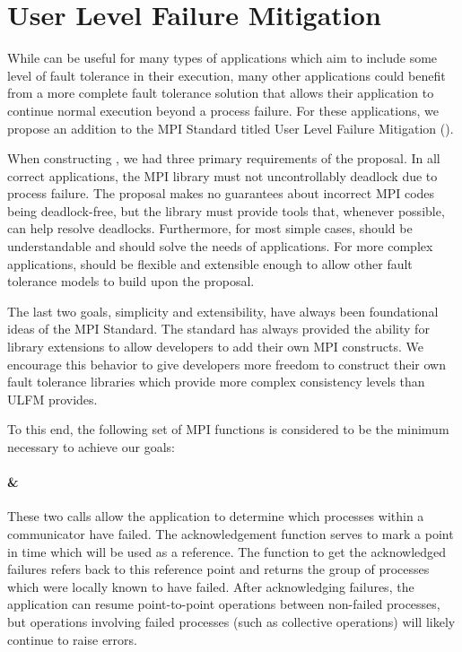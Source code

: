 \section{User Level Failure Mitigation}\label{sect:ulfm}

While \cof can be useful for many types of applications which aim to include
some level of fault tolerance in their execution, many other applications could
benefit from a more complete fault tolerance solution that allows their
application to continue normal execution beyond a process failure. For these
applications, we propose an addition to the MPI Standard titled User Level
Failure Mitigation (\ulfm). 

When constructing \ulfm, we had three primary requirements of the proposal. In
all correct applications, the MPI library must not uncontrollably deadlock due
to process failure. The proposal makes no guarantees about incorrect MPI codes
being deadlock-free, but the library must provide tools that, whenever
possible, can help resolve deadlocks. Furthermore, for most simple cases, \ulfm
should be understandable and should solve the needs of applications. For more
complex applications, \ulfm should be flexible and extensible enough to allow
other fault tolerance models to build upon the proposal. 

The last two goals, simplicity and extensibility, have always been foundational
ideas of the MPI Standard. The standard has always provided the ability for
library extensions to allow developers to add their own MPI constructs. We
encourage this behavior to give developers more freedom to construct their own
fault tolerance libraries which provide more complex consistency levels than
ULFM provides.

To this end, the following set of MPI functions is considered to be the minimum
necessary to achieve our goals:

\paragraph{ \&
}

These two calls allow the application to determine which processes within a
communicator have failed. The acknowledgement function serves to mark a point in
time which will be used as a reference. The function to get the acknowledged
failures refers back to this reference point and returns the group of processes
which were locally known to have failed.  After acknowledging failures, the
application can resume  point-to-point operations
between non-failed processes, but operations involving failed processes (such as
collective operations) will likely continue to raise errors.

